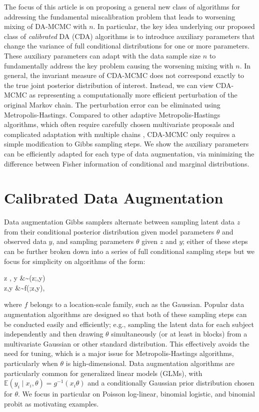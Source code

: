 \documentclass[11pt]{article}
\newcommand{\be}{\begin{equs}}
\newcommand{\ee}{\end{equs}}
\newcommand{\bb}[1]{\mathbb{#1}}
\begin{document}
{The focus of this article is on proposing a general new class of algorithms for addressing the fundamental miscalibration problem that leads to worsening mixing of  DA-MCMC with $n$.  In particular, the key idea underlying our proposed class of {\em calibrated} DA (CDA) algorithms is to introduce auxiliary parameters that change the variance of full conditional distributions for one or more parameters. These auxiliary parameters can adapt with the data sample size $n$ to fundamentally address the key problem causing the worsening mixing with $n$.  In general, the invariant measure of CDA-MCMC does not correspond exactly to the true joint posterior distribution of interest. Instead, we can view CDA-MCMC as representing a computationally more efficient perturbation of the original Markov chain. { The perturbation error can be eliminated using Metropolis-Hastings. Compared to other adaptive Metropolis-Hastings algorithms,
which often require carefully chosen multivariate proposals and complicated adaptation with multiple chains  \citep{tran2016adaptive}, CDA-MCMC only
requires a simple modification to Gibbs sampling steps. We show the auxiliary parameters can be efficiently adapted for each type of data augmentation, via minimizing
the difference between Fisher information of conditional and
marginal distributions.}}


\section{Calibrated Data Augmentation} \label{sec:cda}
Data augmentation Gibbs samplers alternate between sampling  latent data $z$ from their conditional posterior distribution given model parameters $\theta$ and observed data $y$, and sampling parameters $\theta$ given $z$ and $y$; either of these steps can be further broken down into a series of full conditional sampling steps but we focus for simplicity on algorithms of the form: 
\be \label{eq:da}
z \mid \theta, y &\sim \pi(z;\theta,y) \\
\theta \mid z,y &\sim f(\theta;z,y),
\ee
where $f$ belongs to a location-scale family, such as the Gaussian.  Popular data augmentation algorithms are designed so that both of these sampling steps can be conducted easily and efficiently; e.g., sampling the latent data for each subject independently and then drawing $\theta$ simultaneously (or at least in blocks) from a multivariate Gaussian or other standard distribution.  This effectively avoids the need for tuning, which is a major issue for Metropolis-Hastings algorithms, particularly when $\theta$ is high-dimensional.
Data augmentation algorithms are particularly common for generalized linear models (GLMs), with $\bb E(y_i \mid x_i, \theta) = g^{-1}(x_i \theta)$ and a conditionally Gaussian prior distribution chosen for $\theta$. We focus in particular on Poisson log-linear, binomial logistic, and binomial probit as motivating examples.
\end{document}
